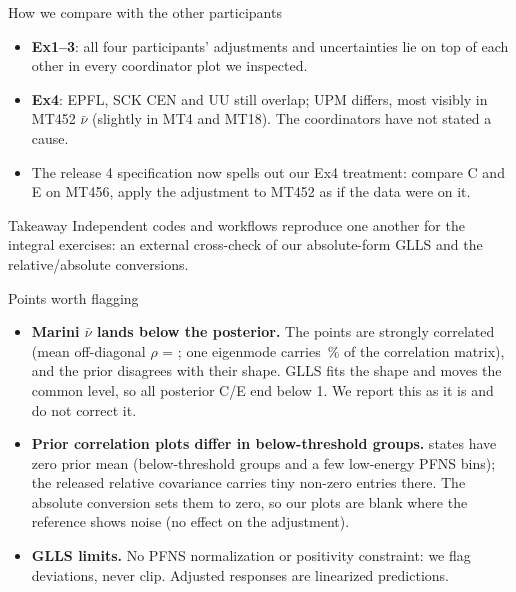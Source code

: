 \documentclass{beamer}
\begin{document}
\begin{frame}{How we compare with the other participants}
    \begin{itemize}
        \item \textbf{Ex1--3}: all four participants' adjustments and uncertainties lie on top of each other
              in every coordinator plot we inspected.
        \item \textbf{Ex4}: EPFL, SCK CEN and UU still overlap; UPM differs, most visibly in MT452 $\bar\nu$
              (slightly in MT4 and MT18). The coordinators have not stated a cause.
        \item The release 4 specification now spells out our Ex4 treatment: compare C and E on MT456,
              apply the adjustment to MT452 as if the data were on it.
    \end{itemize}
    \vspace{2mm}
    \begin{block}{Takeaway}
        Independent codes and workflows reproduce one another for the integral exercises: an external
        cross-check of our absolute-form GLLS and the relative/absolute conversions.
    \end{block}
\end{frame}

\begin{frame}{Points worth flagging}
    \begin{itemize}
        \small
        \item \textbf{Marini $\bar\nu$ lands below the posterior.} The  points are strongly correlated
              (mean off-diagonal $\rho$ = ; one eigenmode carries \,\%
              of the correlation matrix), and the prior disagrees with their shape.
              GLLS fits the shape and moves the common level, so all posterior C/E end below 1.
              We report this as it is and do not correct it.
        \item \textbf{Prior correlation plots differ in below-threshold groups.}  states have
              zero prior mean (below-threshold groups and a few low-energy PFNS bins); the released relative
              covariance carries tiny non-zero entries there. The absolute
              conversion sets them to zero, so our plots are blank where the reference shows noise
              (no effect on the adjustment).
        \item \textbf{GLLS limits.} No PFNS normalization or positivity constraint: we flag deviations, never clip.
              Adjusted responses are linearized predictions.
    \end{itemize}
\end{frame}
\end{document}
